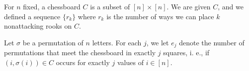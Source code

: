 \documentclass[11pt]{article}
\renewcommand{\>}{\rangle}
\newcommand{\<}{\langle}
\begin{document}
\begin{example} For $n$ fixed, a chessboard $C$ is a subset of $[n] \times [n]$.  We are given $C$, and we defined a sequence $\{r_k\}$ where $r_k$ is the number of ways we can place $k$ nonattacking rooks on $C$.

Let $\sigma$ be a permutation of $n$ letters.  For each $j$, we let $e_j$ denote the number of permutations that meet the chessboard in exactly $j$ squares, i. e., if $(i, \sigma(i)) \in C$ occurs for exactly $j$ values of $i \in [n]$.
\end{example}
 
\end{document}
